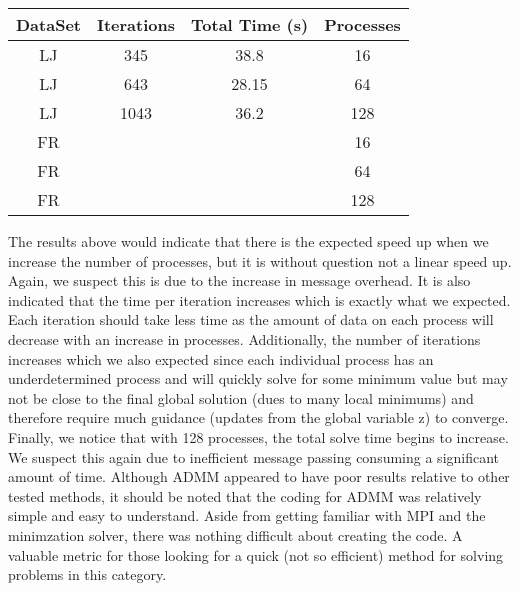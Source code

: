 \documentclass[letterpaper,11pt,onecolumn]{article}
\begin{document}
\begin{center}
  \begin{tabular}{c|c|c|c}
	\hline
	DataSet & Iterations & Total Time (s) & Processes \\
	\hline\hline
	LJ & 345 & 38.8  & 16 \\
	LJ & 643 & 28.15 & 64 \\
	LJ & 1043 & 36.2 & 128 \\
	FR &  &  & 16 \\
	FR &  &  & 64 \\
	FR &  &  & 128 \\
  \end{tabular}
\end{center}
The results above would indicate that there is the expected speed up when we increase the number of processes, but it is without question not a linear speed up. Again, we suspect this is due to the increase in message overhead. It is also indicated that the time per iteration increases which is exactly what we expected. Each iteration should take less time as the amount of data on each process will decrease with an increase in processes. Additionally, the number of iterations increases which we also expected since each individual process has an underdetermined process and will quickly solve for some minimum value but may not be close to the final global solution (dues to many local minimums) and therefore require much guidance (updates from the global variable z) to converge. Finally, we notice that with 128 processes, the total solve time begins to increase. We suspect this again due to inefficient message passing consuming a significant amount of time.
\newline
\pagebreak
Although ADMM appeared to have poor results relative to other tested methods, it should be noted that the coding for ADMM was relatively simple and easy to understand. Aside from getting familiar with MPI and the minimzation solver, there was nothing difficult about creating the code. A valuable metric for those looking for a quick (not so efficient) method for solving problems in this category.
\end{document}
